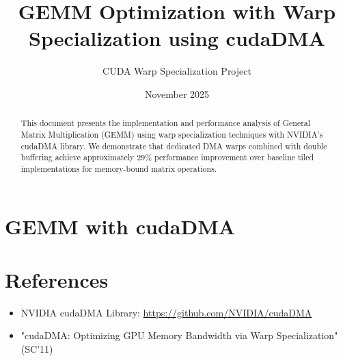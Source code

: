 \documentclass[11pt,a4paper]{article}
\title{GEMM Optimization with Warp Specialization using cudaDMA}
\author{CUDA Warp Specialization Project}
\date{November 2025}
\begin{document}
\maketitle

\begin{abstract}
This document presents the implementation and performance analysis of General Matrix Multiplication (GEMM) using warp specialization techniques with NVIDIA's cudaDMA library. We demonstrate that dedicated DMA warps combined with double buffering achieve approximately 29\% performance improvement over baseline tiled implementations for memory-bound matrix operations.
\end{abstract}

\tableofcontents
\newpage

\section{GEMM with cudaDMA}



\section*{References}
\begin{itemize}
    \item NVIDIA cudaDMA Library: \url{https://github.com/NVIDIA/cudaDMA}
    \item "cudaDMA: Optimizing GPU Memory Bandwidth via Warp Specialization" (SC'11)
\end{itemize}
\end{document}
